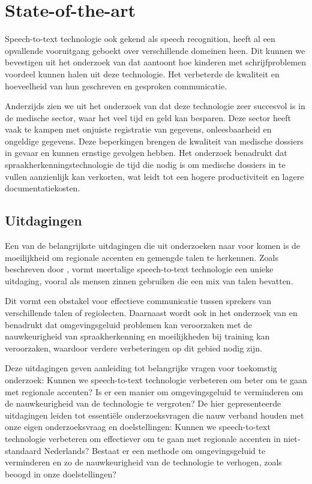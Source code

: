 
\section{State-of-the-art}%
\label{sec:state-of-the-art}
Speech-to-text technologie ook gekend als speech recognition, heeft al een opvallende vooruitgang geboekt over verschillende domeinen heen. Dit kunnen we bevestigen uit het onderzoek van \textcite{Kambouri2023} dat aantoont hoe kinderen met schrijfproblemen voordeel kunnen halen uit deze technologie. Het verbeterde de kwaliteit en hoeveelheid van hun geschreven en gesproken communicatie.

Anderzijds zien we uit het onderzoek van \textcite{ajami2016use} dat deze technologie zeer succesvol is in de medische sector, waar het veel tijd en geld kan besparen. Deze sector heeft vaak te kampen met onjuiste registratie van gegevens, onleesbaarheid en ongeldige gegevens. Deze beperkingen brengen de kwaliteit van medische dossiers in gevaar en kunnen ernstige gevolgen hebben. Het onderzoek benadrukt dat spraakherkenningstechnologie de tijd die nodig is om medische dossiers in te vullen aanzienlijk kan verkorten, wat leidt tot een hogere productiviteit en lagere documentatiekosten.

\subsection{Uitdagingen}
Een van de belangrijkste uitdagingen die uit onderzoeken naar voor komen is de moeilijkheid om regionale accenten en gemengde talen te herkennen. 
Zoals beschreven door \textcite{Reddy2022}, vormt meertalige speech-to-text technologie een unieke uitdaging, vooral als mensen zinnen gebruiken die een mix van talen bevatten. 

Dit vormt een obstakel voor effectieve communicatie tussen sprekers van verschillende talen of regiolecten. Daarnaast wordt ook in het onderzoek van \textcite{ajami2016use} en \textcite{Roepke2019} benadrukt dat omgevingsgeluid problemen kan veroorzaken met de nauwkeurigheid van spraakherkenning en moeilijkheden bij training kan veroorzaken, waardoor verdere verbeteringen op dit gebied nodig zijn.

Deze uitdagingen geven aanleiding tot belangrijke vragen voor toekomstig onderzoek: Kunnen we speech-to-text technologie verbeteren om beter om te gaan met regionale accenten? Is er een manier om omgevingsgeluid te verminderen om de nauwkeurigheid van de technologie te vergroten? De hier gepresenteerde uitdagingen leiden tot essentiële onderzoeksvragen die nauw verband houden met onze eigen onderzoeksvraag en doelstellingen: Kunnen we speech-to-text technologie verbeteren om effectiever om te gaan met regionale accenten in niet-standaard Nederlands? Bestaat er een methode om omgevingsgeluid te verminderen en zo de nauwkeurigheid van de technologie te verhogen, zoals beoogd in onze doelstellingen?


